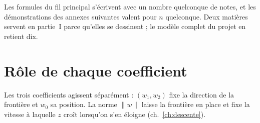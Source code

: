 \FloatBarrier

Les formules du fil principal s'écrivent avec un nombre quelconque de notes, et
les démonstrations des annexes suivantes valent pour $n$ quelconque. Deux
matières servent en partie~I parce qu'elles se dessinent ; le modèle complet du
projet en retient dix.

\section{Rôle de chaque coefficient}

Les trois coefficients agissent séparément : $(w_1,w_2)$ fixe la direction de la
frontière et $w_0$ sa position. La norme $\|w\|$ laisse la frontière en place et
fixe la vitesse à laquelle $z$ croît lorsqu'on s'en éloigne
(ch.~\ref{ch:descente}).

